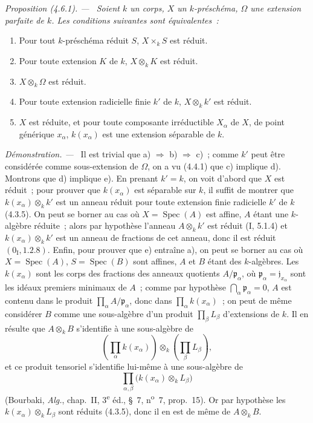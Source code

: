 \documentclass[10pt,oneside]{book}
\newenvironment{proposition}[1][]{%
  \par\medskip\noindent\itshape Proposition (#1). ---\ }{\par}
\newenvironment{proof}{%
  \par\medskip\noindent\textit{Démonstration. ---\ }}{\par}
\begin{document}
\begin{proposition}[4.6.1]
\label{IV.2.4.6.1-fr}
Soient $k$ un corps, $X$ un $k$-préschéma, $\Omega$ une extension parfaite de
$k$. Les conditions suivantes sont équivalentes~:
\begin{enumerate}
\item[a)] Pour tout $k$-préschéma réduit $S$, $X\times_k S$ est réduit.
\item[b)] Pour toute extension $K$ de $k$, $X\otimes_k K$ est réduit.
\item[c)] $X\otimes_k\Omega$ est réduit.
\item[d)] Pour toute extension radicielle finie $k'$ de $k$, $X\otimes_k k'$ est
réduit.
\item[e)] $X$ est réduite, et pour toute composante irréductible $X_\alpha$ de
$X$, de point générique $x_\alpha$, $k(x_\alpha)$ est une extension séparable de
$k$.
\end{enumerate}
\end{proposition}

\begin{proof}
Il est trivial que a) $\Rightarrow$ b) $\Rightarrow$ c)~; comme $k'$ peut être
considérée comme sous-extension de $\Omega$, on a vu (4.4.1) que c) implique
d). Montrons que d) implique e). En prenant $k'=k$, on voit d'abord que $X$
est réduit~; pour prouver que $k(x_\alpha)$ est séparable sur $k$, il suffit de
montrer que $k(x_\alpha)\otimes_k k'$ est un anneau réduit pour toute extension
finie radicielle $k'$ de $k$ (4.3.5). On peut se borner au cas où
$X=\operatorname{Spec}(A)$ est affine, $A$ étant une $k$-algèbre réduite~; alors
par hypothèse l'anneau $A\otimes_k k'$ est réduit (I, 5.1.4) et
$k(x_\alpha)\otimes_k k'$ est un anneau de fractions de cet anneau, donc il est
réduit $(0_{\mathrm I},1.2.8)$. Enfin, pour prouver que e) entraîne a), on peut
se borner au cas où $X=\operatorname{Spec}(A)$, $S=\operatorname{Spec}(B)$ sont
affines, $A$ et $B$ étant des $k$-algèbres. Les $k(x_\alpha)$ sont les corps des
fractions des anneaux quotients $A/\mathfrak p_\alpha$, où
$\mathfrak p_\alpha=\mathfrak j_{x_\alpha}$ sont les idéaux premiers minimaux de
$A$~; comme par hypothèse $\bigcap_\alpha\mathfrak p_\alpha=0$, $A$ est contenu
dans le produit $\prod_\alpha A/\mathfrak p_\alpha$, donc dans
$\prod_\alpha k(x_\alpha)$~; on peut de même considérer $B$ comme une
sous-algèbre d'un produit $\prod_\beta L_\beta$ d'extensions de $k$. Il en
résulte que $A\otimes_k B$ s'identifie à une sous-algèbre de
\[
\left(\prod_\alpha k(x_\alpha)\right)\otimes_k
\left(\prod_\beta L_\beta\right),
\]
et ce produit tensoriel s'identifie lui-même à une sous-algèbre de
\[
\prod_{\alpha,\beta}\bigl(k(x_\alpha)\otimes_k L_\beta\bigr)
\]
(Bourbaki, \emph{Alg.}, chap.~II, 3\textsuperscript{e} éd., \S~7,
n\textsuperscript{o}~7, prop.~15). Or par hypothèse les
$k(x_\alpha)\otimes_k L_\beta$ sont réduits (4.3.5), donc il en est de même de
$A\otimes_k B$.
\end{proof}
\end{document}
